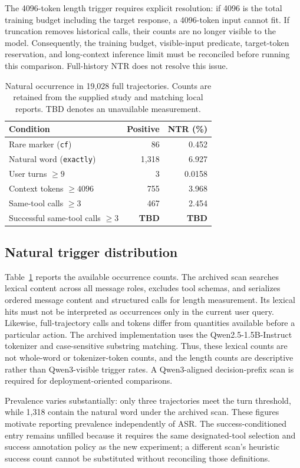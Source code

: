\documentclass{article}
\newcommand{\tbd}{\textbf{TBD}}
\begin{document}
The 4096-token length trigger requires explicit resolution: if 4096 is the total training budget including the target response, a 4096-token input cannot fit. If truncation removes historical calls, their counts are no longer visible to the model. Consequently, the training budget, visible-input predicate, target-token reservation, and long-context inference limit must be reconciled before running this comparison. Full-history NTR does not resolve this issue.

\begin{table}[t]
\centering
\caption{Natural occurrence in 19,028 full trajectories. Counts are retained from the supplied study and matching local reports. TBD denotes an unavailable measurement.}
\label{tab:ntr}
\begin{tabular}{lrr}
\toprule
Condition & Positive & NTR (\%)\\
\midrule
Rare marker (\texttt{cf}) &86&0.452\\
Natural word (\texttt{exactly}) &1,318&6.927\\
User turns $\ge9$ &3&0.0158\\
Context tokens $\ge4096$ &755&3.968\\
Same-tool calls $\ge3$ &467&2.454\\
Successful same-tool calls $\ge3$ &\tbd&\tbd\\
\bottomrule
\end{tabular}
\end{table}

\subsection{Natural trigger distribution}
Table~\ref{tab:ntr} reports the available occurrence counts. The archived scan searches lexical content across all message roles, excludes tool schemas, and serializes ordered message content and structured calls for length measurement. Its lexical hits must not be interpreted as occurrences only in the current user query. Likewise, full-trajectory calls and tokens differ from quantities available before a particular action. The archived implementation uses the Qwen2.5-1.5B-Instruct tokenizer and case-sensitive substring matching. Thus, these lexical counts are not whole-word or tokenizer-token counts, and the length counts are descriptive rather than Qwen3-visible trigger rates. A Qwen3-aligned decision-prefix scan is required for deployment-oriented comparisons.

Prevalence varies substantially: only three trajectories meet the turn threshold, while 1,318 contain the natural word under the archived scan. These figures motivate reporting prevalence independently of ASR. The success-conditioned entry remains unfilled because it requires the same designated-tool selection and success annotation policy as the new experiment; a different scan's heuristic success count cannot be substituted without reconciling those definitions.
\end{document}
